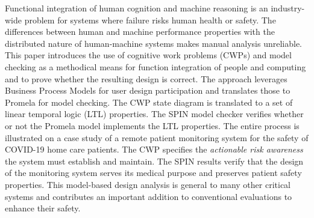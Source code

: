 Functional integration of human cognition and machine reasoning is an industry-wide problem for systems where failure risks human health or safety. The differences between human and machine performance properties with the distributed nature of human-machine systems makes manual analysis unreliable. This paper introduces the use of cognitive work problems (CWPs) and model checking as a methodical means for function integration of people and computing and to prove whether the resulting design is correct. The approach leverages Business Process Models for user design participation and translates those to Promela for model checking. The CWP state diagram is translated to a set of linear temporal logic (LTL) properties. The SPIN model checker verifies whether or not the Promela model implements the LTL properties. The entire process is illustrated on a case study of a remote patient monitoring system for the safety of COVID-19 home care patients. The CWP specifies the \emph{actionable risk awareness} the system must establish and maintain. The SPIN results verify that the design of the monitoring system serves its medical purpose and preserves patient safety properties. This model-based design analysis is general to many other critical systems and contributes an important addition to conventional evaluations to enhance their safety.